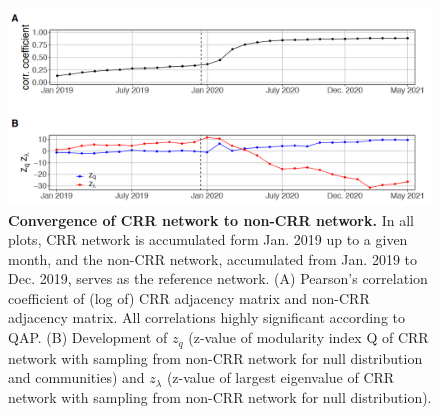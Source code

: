 \begin{figure}[!h]
\includegraphics[width=\textwidth]{1_chapter1/figures/Fig6.png} %
\caption{{\bf Convergence of CRR network to non-CRR network.}
{\small In all plots, CRR network is accumulated form Jan. 2019 up to a given month, and the non-CRR network, accumulated from Jan. 2019 to Dec. 2019, serves as the reference network. (A) Pearson's correlation coefficient of (log of) CRR adjacency matrix and non-CRR adjacency matrix. All correlations highly significant according to QAP. (B) Development of $z_q$ (z-value of modularity index Q of CRR network with sampling from non-CRR network for null distribution and communities) and $z_\lambda$ (z-value of largest eigenvalue of CRR network with sampling from non-CRR network for null distribution).}}
\label{fig:NetwConvergenceExtended} 
\end{figure}

















